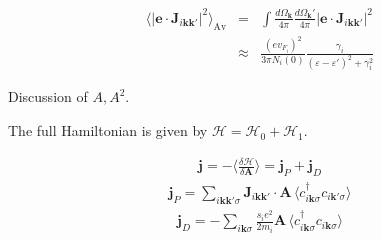 \documentclass[aps,prb,reprint,noeprint,superscriptaddress]{revtex4-1}
\begin{document}
\begin{eqnarray*}
	\langle \left|\mathbf{e} \cdot
	\mathbf{J}_{i\mathbf{kk'}}\right|^2\rangle_{\text{Av}}
	&=& \int \frac{d\Omega_\mathbf{k}}{4\pi} \frac{d\Omega_\mathbf{k}'}{4\pi}
	\left|\mathbf{e} \cdot \mathbf{J}_{i\mathbf{kk'}}\right|^2
	\\
	&\approx& \frac{(e v_{F_i})^2}{3 \pi N_i(0)} 
	\frac{\gamma_i}{(\varepsilon-\varepsilon')^2 + \gamma_i^2}
\end{eqnarray*}

Discussion of $A, A^2$.

The full Hamiltonian is given by $\mathcal{H} = \mathcal{H}_0 +
\mathcal{H}_1$.

\begin{eqnarray*}
  \mathbf{j} = - \bigg\langle \frac{\delta\mathcal{H}}{\delta
  \mathbf{A}}\bigg\rangle = \mathbf{j}_P + \mathbf{j}_D
\end{eqnarray*}
\begin{eqnarray*}
  \mathbf{j}_P = \sum_{i\mathbf{kk'}\sigma}^{}
	\mathbf{J}_{i\mathbf{kk'}} \cdot \mathbf{A} \,
	\langle 
	c_{i\mathbf{k}\sigma}^\dagger  c_{i\mathbf{k}'\sigma}
	\rangle
\end{eqnarray*}
\begin{eqnarray*}
  \mathbf{j}_D = -\sum_{i\mathbf{k}\sigma}^{} \frac{s_i e^2}{2m_i} 
  \mathbf{A} \,
  \langle 
  c_{i\mathbf{k}\sigma}^\dagger c_{i\mathbf{k}\sigma}
  \rangle
\end{eqnarray*}
\end{document}

